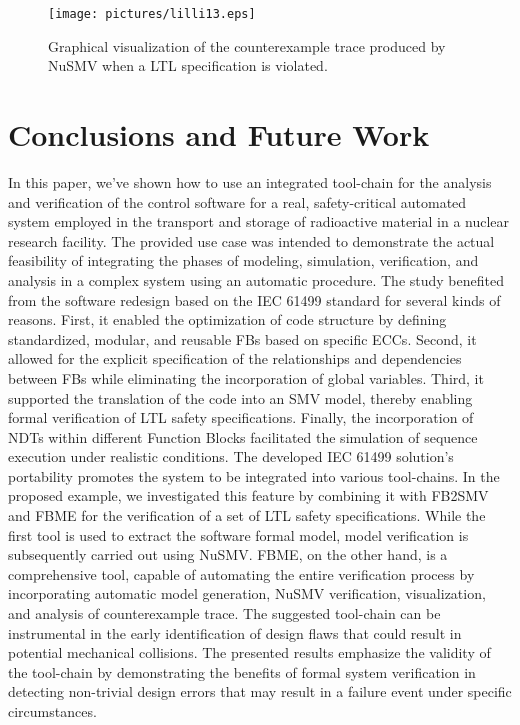 \documentclass{ieeeojies}
\begin{document}
\begin{figure}[t!]
    \centering
    \texttt{[image: pictures/lilli13.eps]}
    \caption{Graphical visualization of the counterexample trace produced by NuSMV when a LTL specification is violated.} 
    \label{fig:counterexample}
\end{figure}

\section{Conclusions and Future Work}
\label{sec:conclusion}
In this paper, we've shown how to use an integrated tool-chain for the analysis and verification of the control software for a real, safety-critical automated system employed in the transport and storage of radioactive material in a nuclear research facility. 
The provided use case was intended to demonstrate the actual feasibility of integrating the phases of modeling, simulation, verification, and analysis in a complex system using an automatic procedure.
The study benefited from the software redesign based on the IEC 61499 standard for several kinds of reasons.
First, it enabled the optimization of code structure by defining standardized, modular, and reusable FBs based on specific ECCs. Second, it allowed for the explicit specification of the relationships and dependencies between FBs while eliminating the incorporation of global variables. Third, it supported the translation of the code into an SMV model, thereby enabling formal verification of LTL safety specifications. Finally, the incorporation of NDTs within different Function Blocks facilitated the simulation of sequence execution under realistic conditions. 
The developed IEC 61499 solution's portability promotes the system to be integrated into various tool-chains. In the proposed example, we investigated this feature by combining it with FB2SMV and FBME for the verification of a set of LTL safety specifications. 
While the first tool is used to extract the software formal model, model verification is subsequently carried out using NuSMV. FBME, on the other hand, is a comprehensive tool, capable of automating the entire verification process by incorporating automatic model generation, NuSMV verification, visualization, and analysis of counterexample trace.
The suggested tool-chain can be instrumental in the early identification of design flaws that could result in potential mechanical collisions. The presented results emphasize the validity of the tool-chain by demonstrating the benefits of formal system verification in detecting non-trivial design errors that may result in a failure event under specific circumstances.
\end{document}
